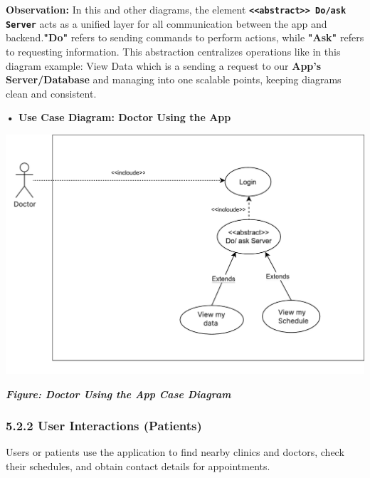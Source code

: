 \documentclass[12pt]{report}
\begin{document}
\vspace{0.5cm}

\noindent \textbf{Observation:} In this and other diagrams, the element \textbf{ \texttt{<<abstract>> Do/ask Server}} acts as a unified layer for all communication between the app and backend.\textbf{"Do"} refers to sending commands to perform actions, while \textbf{"Ask"} refers to requesting information. This abstraction centralizes operations like in this diagram example: View Data which is a sending a request to our \textbf{App's Server/Database} and managing into one scalable points, keeping diagrams clean and consistent.



\vspace{0.5cm}
\noindent \textbf{• Use Case Diagram: Doctor Using the App}
\vspace{0.6cm}
\begin{center}
	\includegraphics[width=\textwidth]{images/doctorCAS.pdf}
\end{center}
\vspace{-0.85cm}
\begin{center}
	\textit{\textbf{Figure: Doctor Using the App Case Diagram}}
\end{center}

\newpage
\subsubsection*{\textbf{5.2.2 User Interactions (Patients)}}
Users or patients use the application to find nearby clinics and doctors, check their schedules, and obtain contact details for appointments.
\end{document}
